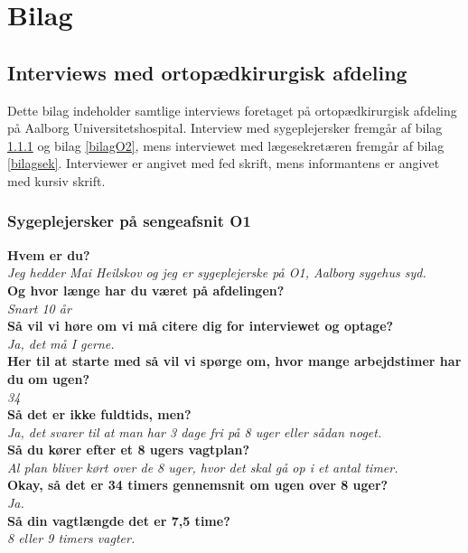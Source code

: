 \chapter{Bilag}

\section{Interviews med ortopædkirurgisk afdeling}
Dette bilag indeholder samtlige interviews foretaget på ortopædkirurgisk afdeling på Aalborg Universitetshospital. Interview med sygeplejersker fremgår af bilag \ref{bilagO1} og bilag \ref{bilagO2}, mens interviewet med lægesekretæren fremgår af bilag \ref{bilagsek}. Interviewer er angivet med fed skrift, mens informantens er angivet med kursiv skrift. 

\subsection{Sygeplejersker på sengeafsnit O1} \label{bilagO1}
\textbf{Hvem er du?} \\
\noindent
\textit{Jeg hedder Mai Heilskov og jeg er sygeplejerske på O1, Aalborg sygehus syd. } \\
\noindent
\textbf{Og hvor længe har du været på afdelingen?}\\
\noindent
\textit{Snart 10 år} \\
\noindent
\textbf{Så vil vi høre om vi må citere dig for interviewet og optage?}\\
\noindent
\textit{ Ja, det må I gerne.}  \\
\noindent
\textbf{Her til at starte med så vil vi spørge om, hvor mange arbejdstimer har du om ugen?} \\
\noindent
\textit{34} \\
\noindent
\textbf{Så det er ikke fuldtids, men?} \\
\noindent
\textit{Ja, det svarer til at man har 3 dage fri på 8 uger eller sådan noget.} \\
\noindent
\textbf{Så du kører efter et 8 ugers vagtplan?} \\
\noindent
\textit{Al plan bliver kørt over de 8 uger, hvor det skal gå op i et antal timer.} \\
\noindent
\textbf{Okay, så det er 34 timers gennemsnit om ugen over 8 uger?} \\
\noindent
\textit{Ja.} \\
\noindent
\textbf{Så din vagtlængde det er 7,5 time? } \\
\noindent
\textit{8 eller 9 timers vagter.} \\
